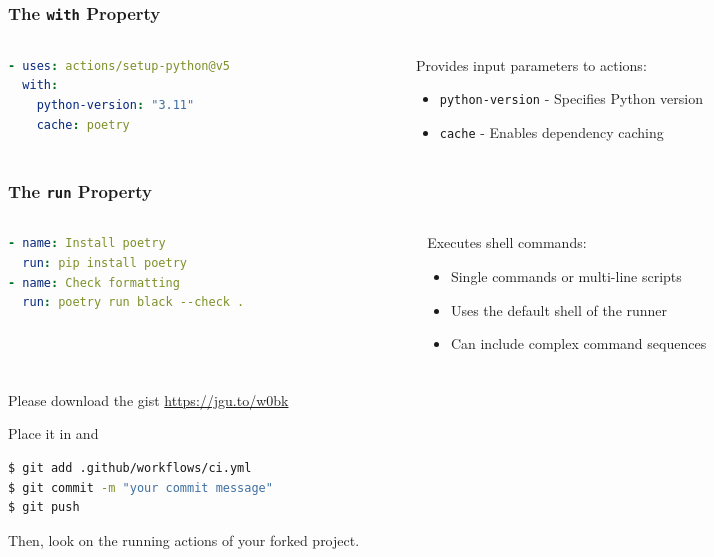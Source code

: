 \begin{frame}[fragile]
	\frametitle{The \texttt{with} Property}
	\begin{columns}
		\begin{column}{0.5\textwidth}
			\begin{lstlisting}[language=yaml,basicstyle=\small\ttfamily]
- uses: actions/setup-python@v5
  with:
    python-version: "3.11"
    cache: poetry
			\end{lstlisting}
		\end{column}
		\begin{column}{0.5\textwidth}
			Provides input parameters to actions:
			\begin{itemize}
				\item \texttt{python-version} - Specifies Python version
				\item \texttt{cache} - Enables dependency caching
			\end{itemize}
		\end{column}
	\end{columns}
\end{frame}

\begin{frame}[fragile]
	\frametitle{The \texttt{run} Property}
	\begin{columns}
		\begin{column}{0.5\textwidth}
			\begin{lstlisting}[language=yaml,basicstyle=\small\ttfamily]
- name: Install poetry
  run: pip install poetry
- name: Check formatting
  run: poetry run black --check .
			\end{lstlisting}
		\end{column}
		\begin{column}{0.5\textwidth}
			Executes shell commands:
			\begin{itemize}
				\item Single commands or multi-line scripts
				\item Uses the default shell of the runner
				\item Can include complex command sequences
			\end{itemize}
		\end{column}
	\end{columns}
\end{frame}

\begin{frame}[fragile]
	\frametitle{}
	\begin{task}
		{Please download the gist \url{https://jgu.to/w0bk}}
	\end{task}
    Place it in  and
    \begin{lstlisting}[language=Bash, style=Shell]
$ git add .github/workflows/ci.yml
$ git commit -m "your commit message"
$ git push
    \end{lstlisting}
    Then, look on the running actions of your forked project.
\end{frame}

